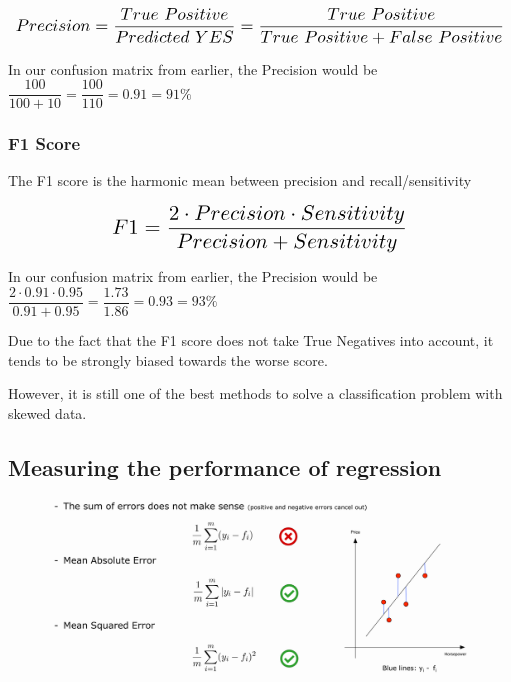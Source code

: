 \documentclass[a4paper, 11pt]{article}
\begin{document}
\[\scalebox{1.5}{
        $Precision = \dfrac{True\ Positive}{Predicted\ YES} = \dfrac{True\ Positive}{True\ Positive + False\ Positive}$
}\]

\vspace{10px}

In our confusion matrix from earlier, the Precision would be $\dfrac{100}{100+ 10} = \dfrac{100}{110} = 0.91 = 91\%$

\subsubsection{F1 Score}

The F1 score is the harmonic mean between precision and recall/sensitivity

\[\scalebox{1.5}{
        $F1 = \dfrac{2 \cdot Precision \cdot Sensitivity}{Precision + Sensitivity} $
}\]

In our confusion matrix from earlier, the Precision would be $\dfrac{2 \cdot 0.91 \cdot 0.95}{0.91 + 0.95} = \dfrac{1.73}{1.86} = 0.93 = 93\%$

\vspace{10px}

Due to the fact that the F1 score does not take True Negatives into account, it tends to be strongly biased towards the worse score. 

However, it is still one of the best methods to solve a classification problem with skewed data.


\subsection{Measuring the performance of regression}

\begin{figure}[htb]
    \centering
    \includegraphics[keepaspectratio=true, width=\linewidth]{regression_error.png}
    \label{fig:regression_error}
\end{figure}
\end{document}
